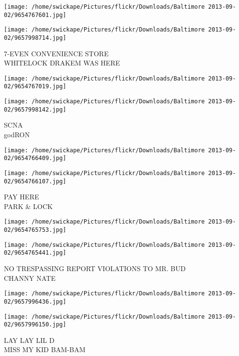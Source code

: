 \documentclass[10pt,letterpaper]{article}
\begin{document}
\texttt{[image: /home/swickape/Pictures/flickr/Downloads/Baltimore 2013-09-02/9654767601.jpg]}

\vspace{0.25in}
\texttt{[image: /home/swickape/Pictures/flickr/Downloads/Baltimore 2013-09-02/9657998714.jpg]}

7{-}EVEN CONVENIENCE STORE\\
WHITELOCK DRAKEM WAS HERE\\
\pagebreak

\texttt{[image: /home/swickape/Pictures/flickr/Downloads/Baltimore 2013-09-02/9654767019.jpg]}

\vspace{0.25in}
\texttt{[image: /home/swickape/Pictures/flickr/Downloads/Baltimore 2013-09-02/9657998142.jpg]}

SCNA\\
godRON\\
\pagebreak

\texttt{[image: /home/swickape/Pictures/flickr/Downloads/Baltimore 2013-09-02/9654766409.jpg]}

\vspace{0.25in}
\texttt{[image: /home/swickape/Pictures/flickr/Downloads/Baltimore 2013-09-02/9654766107.jpg]}

PAY HERE\\
PARK \& LOCK\\
\pagebreak

\texttt{[image: /home/swickape/Pictures/flickr/Downloads/Baltimore 2013-09-02/9654765753.jpg]}

\vspace{0.25in}
\texttt{[image: /home/swickape/Pictures/flickr/Downloads/Baltimore 2013-09-02/9654765441.jpg]}

NO TRESPASSING REPORT VIOLATIONS TO MR. BUD\\
CHANNY NATE\\
\pagebreak

\texttt{[image: /home/swickape/Pictures/flickr/Downloads/Baltimore 2013-09-02/9657996436.jpg]}

\vspace{0.25in}
\texttt{[image: /home/swickape/Pictures/flickr/Downloads/Baltimore 2013-09-02/9657996150.jpg]}

LAY LAY LIL D\\
MISS MY KID BAM{-}BAM\\
\pagebreak
\end{document}
